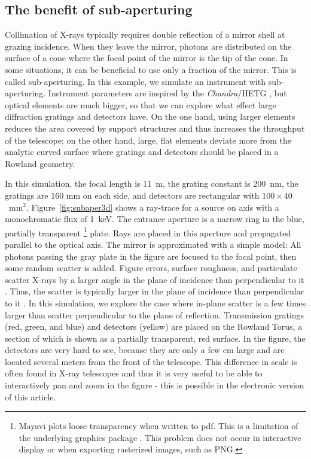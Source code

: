 \documentclass[twocolumn]{aastex61}
\begin{document}
\subsection{The benefit of sub-aperturing}
Collimation of X-rays typically requires double reflection of a mirror
shell at grazing incidence. When they leave the mirror, photons are distributed
on the surface of a cone where the focal point of the mirror is the tip of the
cone. In some situations, it can be beneficial to use only a fraction of the mirror. This is called sub-aperturing. In this
example, we simulate an instrument with sub-aperturing. Instrument parameters
are inspired by the \emph{Chandra}/HETG \citep{2005PASP..117.1144C}, but
optical elements are much bigger, so that we can explore what effect large
diffraction gratings and detectors have. On the one hand, using larger elements
reduces the area covered by support structures and thus increases the
throughput of the telescope; on the other hand, large, flat elements deviate
more from the analytic curved surface where gratings and detectors should be
placed in a Rowland geometry.

In this simulation, the focal length is 11~m, the grating constant is 200~nm,
the gratings are 160 mm on each side, and detectors are rectangular with
$100\times40$~mm$^2$. Figure~\ref{fig:subaper3d} shows a ray-trace for a source
on axis with a monochromatic flux of 1~keV. The entrance aperture is a narrow
ring in the blue, partially transparent
\footnote{Mayavi plots loose transparency when written to pdf. This is a
  limitation of the underlying graphics package \citep[see discussion
    in][]{2016ApJ...818..115V}. This problem does not occur in interactive
  display or when exporting rasterized images, such as PNG.}
plate. Rays are
placed in this aperture and propagated parallel to the optical axis. The mirror
is approximated with a simple model: All photons passing the gray plate in the figure are
focused to the focal point, then some random scatter is added. Figure errors,
surface roughness, and particulate scatter X-rays by a larger angle in the
plane of incidence than perpendicular to it \citep{Cash:87}. Thus, the scatter
is typically larger in the plane of incidence than perpendicular to it
\citep{1993SPIE.1742..171O,2015SPIE.9603E..0KC}. In this simulation, we
explore the case where in-plane scatter is a few times larger than scatter
perpendicular to the plane of reflection.  Transmission gratings (red, green,
and blue) and detectors (yellow) are placed on the Rowland Torus, a section of
which is shown as a partially transparent, red surface. In the figure, the
detectors are very hard to see, because they are only a few cm large and are
located several meters from the front of the telescope. This difference in
scale is often found in X-ray telescopes and thus it is very useful to be able
to interactively pan and zoom in the figure - this is possible in the
electronic version of this article.
\end{document}
